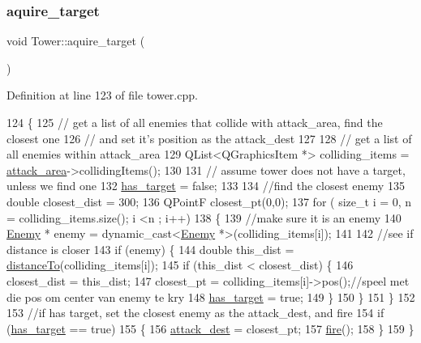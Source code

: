 \subsubsection{\texorpdfstring{aquire\+\_\+target}{aquire\_target}}
{\footnotesize\ttfamily void Tower\+::aquire\+\_\+target (\begin{DoxyParamCaption}{ }\end{DoxyParamCaption})\hspace{0.3cm}{\ttfamily [slot]}}



Definition at line 123 of file tower.\+cpp.


\begin{DoxyCode}
124 \{
125     \textcolor{comment}{// get a list of all enemies that collide with attack\_area, find the closest one}
126     \textcolor{comment}{// and set it's position as the attack\_dest}
127 
128     \textcolor{comment}{// get a list of all enemies within attack\_area}
129     QList<QGraphicsItem *> colliding\_items = \hyperlink{class_tower_a628af042db1aa134f2ab18b1f2b0eeb9}{attack\_area}->collidingItems();
130 
131     \textcolor{comment}{// assume tower does not have a target, unless we find one}
132     \hyperlink{class_tower_a568b9b12bc604fb245a79476b71d6557}{has\_target} = \textcolor{keyword}{false};
133 
134     \textcolor{comment}{//find the closest enemy}
135     \textcolor{keywordtype}{double} closest\_dist = 300;
136     QPointF closest\_pt(0,0);
137     \textcolor{keywordflow}{for} ( \textcolor{keywordtype}{size\_t} i = 0, n = colliding\_items.size(); i <n ; i++)
138     \{
139         \textcolor{comment}{//make sure it is an enemy}
140         \hyperlink{class_enemy}{Enemy} * enemy = \textcolor{keyword}{dynamic\_cast<}\hyperlink{class_enemy}{Enemy} *\textcolor{keyword}{>}(colliding\_items[i]);
141 
142         \textcolor{comment}{//see if distance is closer}
143         \textcolor{keywordflow}{if} (enemy) \{
144             \textcolor{keywordtype}{double} this\_dist = \hyperlink{class_tower_a1b04543304dcd92cee3c0909362a9a3f}{distanceTo}(colliding\_items[i]);
145             \textcolor{keywordflow}{if} (this\_dist < closest\_dist) \{
146                 closest\_dist = this\_dist;
147                 closest\_pt = colliding\_items[i]->pos();\textcolor{comment}{//speel met die pos om center van enemy te kry}
148                 \hyperlink{class_tower_a568b9b12bc604fb245a79476b71d6557}{has\_target} = \textcolor{keyword}{true};
149             \}
150         \}
151     \}
152 
153     \textcolor{comment}{//if has target, set the closest enemy as the attack\_dest, and fire}
154     \textcolor{keywordflow}{if} (\hyperlink{class_tower_a568b9b12bc604fb245a79476b71d6557}{has\_target} == \textcolor{keyword}{true})
155     \{
156         \hyperlink{class_tower_a2b3e8ab90ccceed1fa3a667db80c2c06}{attack\_dest} = closest\_pt;
157         \hyperlink{class_tower_aa0c9c780f48cffacd3da6877f5d4fdc2}{fire}();
158     \}
159 \}
\end{DoxyCode}
\mbox{\label{class_tower_a1b04543304dcd92cee3c0909362a9a3f}} 
